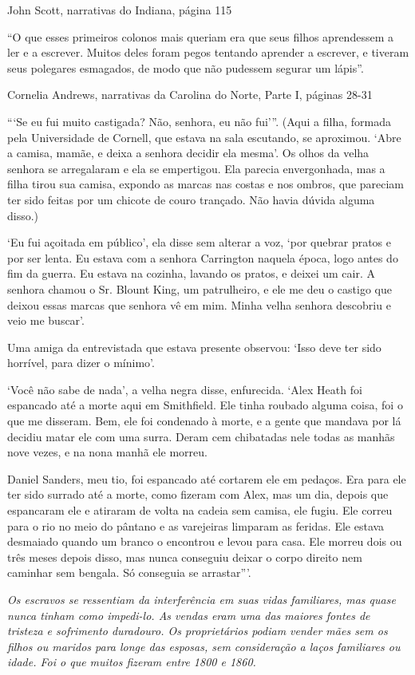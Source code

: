 John Scott, narrativas do Indiana, página 115

``O que esses primeiros colonos mais queriam era que seus filhos
aprendessem a ler e a escrever. Muitos deles foram pegos tentando
aprender a escrever, e tiveram seus polegares esmagados, de modo que não
pudessem segurar um lápis''.

Cornelia Andrews, narrativas da Carolina do Norte, Parte I, páginas
28-31

```Se eu fui muito castigada? Não, senhora, eu não fui'''. (Aqui a
filha, formada pela Universidade de Cornell, que estava na sala
escutando, se aproximou. `Abre a camisa, mamãe, e deixa a senhora
decidir ela mesma'. Os olhos da velha senhora se arregalaram e ela se
empertigou. Ela parecia envergonhada, mas a filha tirou sua camisa,
expondo as marcas nas costas e nos ombros, que pareciam ter sido feitas
por um chicote de couro trançado. Não havia dúvida alguma disso.)

`Eu fui açoitada em público', ela disse sem alterar a voz, `por quebrar
pratos e por ser lenta. Eu estava com a senhora Carrington naquela
época, logo antes do fim da guerra. Eu estava na cozinha, lavando os
pratos, e deixei um cair. A senhora chamou o Sr. Blount King, um
patrulheiro, e ele me deu o castigo que deixou essas marcas que senhora
vê em mim. Minha velha senhora descobriu e veio me buscar'.

Uma amiga da entrevistada que estava presente observou: `Isso deve ter
sido horrível, para dizer o mínimo'.

`Você não sabe de nada', a velha negra disse, enfurecida. `Alex Heath
foi espancado até a morte aqui em Smithfield. Ele tinha roubado alguma
coisa, foi o que me disseram. Bem, ele foi condenado à morte, e a gente
que mandava por lá decidiu matar ele com uma surra. Deram cem chibatadas
nele todas as manhãs nove vezes, e na nona manhã ele morreu.

Daniel Sanders, meu tio, foi espancado até cortarem ele em pedaços. Era
para ele ter sido surrado até a morte, como fizeram com Alex, mas um
dia, depois que espancaram ele e atiraram de volta na cadeia sem camisa,
ele fugiu. Ele correu para o rio no meio do pântano e as varejeiras
limparam as feridas. Ele estava desmaiado quando um branco o encontrou e
levou para casa. Ele morreu dois ou três meses depois disso, mas nunca
conseguiu deixar o corpo direito nem caminhar sem bengala. Só conseguia
se arrastar'''.

\emph{Os escravos se ressentiam da interferência em suas vidas
familiares, mas quase nunca tinham como impedi-lo. As vendas eram uma
das maiores fontes de tristeza e sofrimento duradouro. Os proprietários
podiam vender mães sem os filhos ou maridos para longe das esposas, sem
consideração a laços familiares ou idade. Foi o que muitos fizeram entre
1800 e 1860.}

